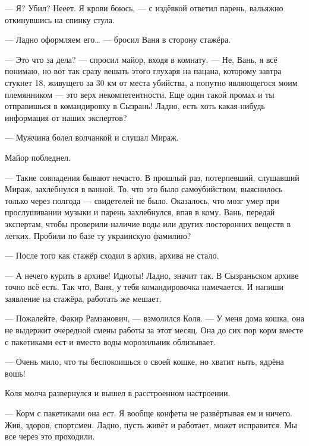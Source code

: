 --- Я? Убил? Нееет. Я крови боюсь, --- с издёвкой ответил парень, вальяжно откинувшись на спинку стула.

--- Ладно оформляем его… --- бросил Ваня в сторону стажёра.



--- Это что за дела? --- спросил майор, входя в комнату. --- Не, Вань, я всё понимаю, но вот так сразу вешать этого глухаря на пацана, которому завтра стукнет 18, живущего за 30 км от места убийства, а попутно являющегося моим племянником --- это верх некомпетентности. Еще один такой промах и ты отправишься в командировку в Сызрань! Ладно, есть хоть какая-нибудь информация от наших экспертов?



--- Мужчина болел волчанкой и слушал Мираж.


Майор побледнел.



--- Такие совпадения бывают нечасто. В прошлый раз, потерпевший, слушавший Мираж, захлебнулся в ванной. То, что это было самоубийством, выяснилось только через полгода --- свидетелей не было. Оказалось, что мозг умер при прослушивании музыки и парень захлебнулся, впав в кому. Вань, передай экспертам, чтобы проверили наличие воды или других посторонних веществ в легких. Пробили по базе ту украинскую фамилию?



--- После того как стажёр сходил в архив, архива не стало.



--- А нечего курить в архиве! Идиоты! Ладно, значит так. В Сызраньском архиве точно всё есть. Так что, Ваня, у тебя командировочка намечается. И напиши заявление на стажёра, работать же мешает.



--- Пожалейте, Факир Рамзанович, --- взмолился Коля. --- У меня дома кошка, она не выдержит очередной смены работы за этот месяц. Она до сих пор корм вместе с пакетиками ест и вместо воды морозильник облизывает.



--- Очень мило, что ты беспокоишься о своей кошке, но хватит ныть, ядрёна вошь!


Коля молча развернулся и вышел в расстроенном настроении.



--- Корм с пакетиками она ест. Я вообще конфеты не развёртывая ем и ничего. Жив, здоров, спортсмен. Ладно, пусть живёт и работает, может исправится. Мы все через это проходили.



